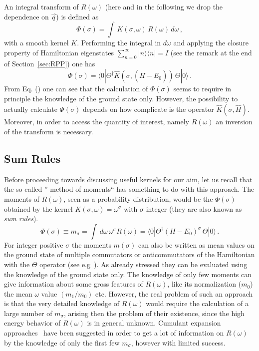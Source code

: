 An integral transform of $R(\omega)$ (here and in the following we drop the dependence on $\vec q$) is defined as
\begin{equation}\label{phisigma1}
 \Phi(\sigma)=\int\, K(\sigma,\omega)\,R(\omega) \,d\omega\,,
\end{equation}
with a smooth kernel $K$. Performing the integral in $d\omega$ and applying 
the closure property of Hamiltonian eigenstates 
$\sum_{n=0}^\infty |n\rangle\langle n|=I$  (see the remark at the end of Section~\ref{sec:RPP}) one has
\begin{equation}\label{phisigma2}
\Phi(\sigma)=\langle 0|\Theta^\dagger\hat{K}\left(\sigma,(\hat{H}-E_0)\right)\,\Theta|0\rangle\,.
\end{equation}
From Eq. () one can see that the calculation of $\Phi(\sigma)$ seems to require in principle the knowledge of the ground state 
only. However, the possibility to actually calculate $\Phi(\sigma)$ depends on how complicate is the operator $\hat{K}(\sigma,\hat{H})$. 
Moreover, in order to access the quantity of interest, namely $R(\omega)$ an inversion of the transform is necessary.

\subsection{Sum Rules}\label{SR}

Before proceeding towards discussing useful kernels for our aim, let us recall that the so called '' method of moments`` 
has something to do with this approach. The moments of $R(\omega)$, seen as a probability distribution, would be the 
$\Phi(\sigma)$ obtained by the kernel $ K(\sigma,\omega)=\omega^\sigma$ with $\sigma$ integer (they are also known as {\it sum rules}). 
\begin{equation}\label{sumrule}
\Phi(\sigma)\equiv m_\sigma=\int \, d\omega\, \omega^\sigma R(\omega) = \langle 0|\Theta^\dagger (H-E_0)^\sigma\,\Theta|0\rangle\,.
\end{equation}
For integer positive $\sigma$ the moments $m(\sigma)$ can also be written as mean values on the ground state of multiple commutators or 
anticommutators of the Hamiltonian with the $\Theta $ operator (see e.g~\cite{OTrep}). 
As already stressed they can be evaluated using the knowledge of 
the ground state only. The knowledge of only few moments can give information about some gross features of $R(\omega)$, like
its normalization ($m_0$) the mean $\omega$ value $(m_1/m_0)$ etc. However, the real problem 
of such an approach is that the very detailed knowledge of $R(\omega)$ would require the calculation of a large number 
of $m_\sigma$, arising then the problem of their existence, since the high energy behavior of $R(\omega)$ is in general 
unknown. Cumulant expansion approaches~\cite{Rosenf:1980} have been suggested in order to get a lot of information on $R(\omega)$ 
by the knowledge of only the first few $m_\sigma$, however with limited success.

